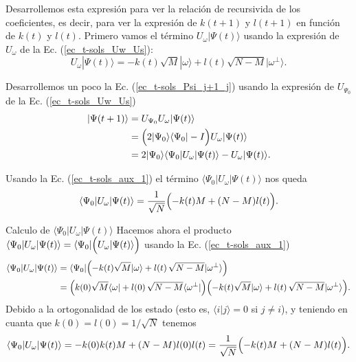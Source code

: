 \documentclass[a4paper,11pt]{book} %
\numberwithin{equation}{chapter}
\def\Lp{\Bigl(}
\def\Rp{\Bigr)}
\begin{document}
Desarrollemos esta expresión para ver la relación de recursivida de los coeficientes, es decir, para ver la expresión de $k(t+1)$ y $l(t+1)$ en función de $k(t)$ y $l(t)$. Primero vamos el término $U_\omega |\Psi(t) \rangle$ usando la expresión de $U_\omega$ de la Ec. (\ref{ec_t-sols_Uw_Us}):
\begin{equation} \label{ec_t-sols_aux_1}
U_\omega |\Psi(t) \rangle =  - k(t)  \sqrt{M}|\omega \rangle + l(t) \sqrt{N-M} | \omega^{\perp} \rangle.
\end{equation}

Desarrollemos un poco la Ec. (\ref{ec_t-sols_Psi_j+1_j}) usando la expresión de $U_{\Psi_0}$ de la  Ec. (\ref{ec_t-sols_Uw_Us})
\begin{equation} \label{ec_t-sols_aux_2}
\begin{split}
|\Psi(t+1) \rangle & =  U_{\Psi_0} U_\omega |\Psi(t) \rangle  \\
& =  \Bigl( 2 |\Psi_0 \rangle \langle \Psi_0 | - I \Bigr) U_\omega |\Psi(t) \rangle  \\ 
& =  2 |\Psi_0 \rangle \langle \Psi_0 |  U_\omega |\Psi(t) \rangle  - U_\omega |\Psi(t) \rangle .
\end{split}
\end{equation}

Usando la Ec. (\ref{ec_t-sols_aux_1}) el término $\langle \Psi_0 |  U_\omega |\Psi(t) \rangle$ nos queda
\begin{equation} \label{ec_t-sols_aux_3}
\langle \Psi_0 | U_\omega |\Psi(t) \rangle = \frac{1}{\sqrt{N}} \Lp -k(t) M + (N-M) l(t) \Rp.
\end{equation}

	\begin{mybox_green}{Calculo de $\langle \Psi_0 |  U_\omega |\Psi(t) \rangle$}
	Hacemos ahora el producto $ \langle \Psi_0 |  U_\omega |\Psi(t) \rangle  =  \langle \Psi_0 | \Lp U_\omega |\Psi(t) \rangle \Rp $ 
	usando la Ec. (\ref{ec_t-sols_aux_1})
	\begin{equation*}
	\begin{split}
	\langle \Psi_0 | U_\omega |\Psi(t) \rangle 
	& = \langle \Psi_0 | \Lp -k(t) \sqrt{M} |\omega \rangle + l(t) \, \sqrt{N-M} | \omega^{\perp} \rangle \Rp \\
	& = \Lp k(0) \sqrt{M} \langle \omega| + l(0) \, \sqrt{N-M} \langle \omega^{\perp} | \Rp
	\Lp -k(t) \sqrt{M} |\omega \rangle + l(t) \, \sqrt{N-M} | \omega^{\perp} \rangle \Rp .
	\end{split}
	\end{equation*}
	Debido a la ortogonalidad de los estado (esto es, $\langle i | j \rangle =0$ si $j\neq i$), y teniendo en cuanta que $k(0) = l(0) = 1/\sqrt{N}$ tenemos
	\begin{equation*} 
	\langle \Psi_0 | U_\omega |\Psi(t) \rangle = - k(0) k(t) M + (N-M) l(0) l(t) = 
	\frac{1}{\sqrt{N}} \Lp -k(t) M + (N-M) l(t) \Rp.
	\end{equation*}
	\end{mybox_green}	
\end{document}
